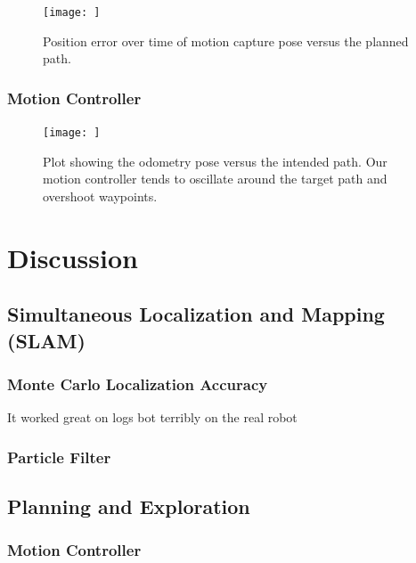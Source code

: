 \documentclass[journal]{IEEEtran}
\begin{document}
            \begin{figure}
                \centering
                \texttt{[image: ]}
                \caption{Position error over time of motion capture pose versus the planned path.}
                \label{fig:astar_error}
            \end{figure}
    
        \subsubsection{Motion Controller}
        
        
            \begin{figure}
                \centering
                \texttt{[image: ]}
                \caption{Plot showing the odometry pose versus the intended path. Our motion controller tends to oscillate around the target path and overshoot waypoints.}
                \label{fig:motion_controller}
            \end{figure}
    
            
\section{Discussion}

    \subsection{Simultaneous Localization and Mapping (SLAM)}
    
        \subsubsection{Monte Carlo Localization Accuracy}
        
            It worked great on logs bot terribly on the real robot
        
            
        \subsubsection{Particle Filter}

    \subsection{Planning and Exploration}
    
        \subsubsection{Motion Controller}
    
\end{document}
